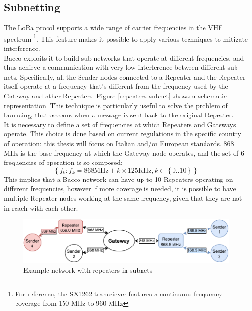 \subsection{Subnetting}
The LoRa procol supports a wide range of carrier frequencies in the \gls{VHF} spectrum \footnote{For reference, the
SX1262\cite{sx1262} transciever features a continuous frequency coverage from 150 MHz to 960 MHz}. This feature makes
it possible to apply various techniques to mitigate interference.\\
Bacco exploits it to build sub-networks that operate at different frequencies, and thus achieve a communication with very low
interference between different sub-nets. Specifically, all the Sender nodes connected to a Repeater and the Repeater
itself operate at a frequency that's different from the frequency used by the Gateway and other Repeaters. Figure \ref{repeaters
subnet} shows a schematic representation. This technique is particularly useful to solve the problem of bouncing, that occours
when a message is sent back to the original Repeater.\\
It is necessary to define a set of frequencies at which Repeaters and Gateways operate. This choice is done
based on current regulations in the specific country of operation; this thesis will focus on Italian and/or European
standards. 868 MHz is the base frequency at which the Gateway node operates, and the set of 6 frequencies of operation
is so composed:
\begin{equation}
\label{set of frequencies}
\left\{ f_k : f_k = 868\text{MHz} + k \times 125\text{KHz}, k\in \left\{0..10 \right\} \right\}
\end{equation}
This implies that a Bacco network can have up to 10 Repeaters operating on different frequencies, however if more coverage
is needed, it is possible to have multiple Repeater nodes working at the same frequency, given that they are not in
reach with each other.


\begin{figure}[ht]
    \centering
    \includegraphics[width=\linewidth]{uml/repeaters_subnet.pdf}
    \caption{Example network with repeaters in subnets}
    \label{repeaters subnet}
\end{figure}


